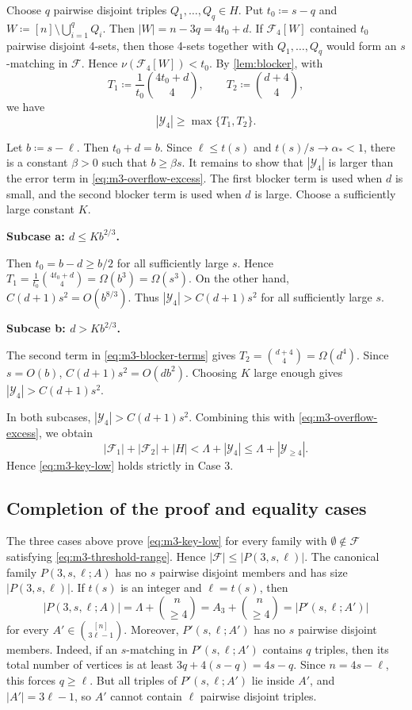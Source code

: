 \documentclass[10pt,a4paper]{article}
\numberwithin{equation}{section}
\theoremstyle{definition}
\newcommand{\F}{\mathcal F}
\newcommand{\Y}{\mathcal Y}
\begin{document}
Choose \(q\) pairwise disjoint triples \(Q_1,\ldots,Q_q\in H\).
Put $t_0\coloneqq s-q$ and $W\coloneqq[n]\setminus\bigcup_{i=1}^q Q_i$.
Then \(|W|=n-3q=4t_0+d\).  If \(\F_4[W]\) contained \(t_0\) pairwise
disjoint 4-sets, then those 4-sets together with
\(Q_1,\ldots,Q_q\) would form an \(s\)-matching in \(\F\).  Hence
\(\nu(\F_4[W])<t_0\).  By \cref{lem:blocker}, with
\[
    T_1\coloneqq \frac1{t_0}\binom{4t_0+d}{4},
    \qquad
    T_2\coloneqq \binom{d+4}{4},
\]
we have
\begin{equation}\label{eq:m3-blocker-terms}
    |\Y_4|
    \ge
    \max\{T_1,T_2\}.
\end{equation}

Let
\(b\coloneqq s-\ell.\)
Then \(t_0+d=b\).  Since \(\ell\le t(s)\) and \(t(s)/s\to\alpha_*<1\),
there is a constant \(\beta>0\) such that
\(b\ge \beta s.\)
It remains to show that \(|\Y_4|\) is larger than the error term in
\eqref{eq:m3-overflow-excess}.  The first blocker term is used when
\(d\) is small, and the second blocker term is used when
\(d\) is large.  Choose a sufficiently large constant \(K\).

\medskip
\noindent\textbf{Subcase a: \(d\le Kb^{2/3}\).}
\medskip

Then \(t_0=b-d\ge b/2\) for all sufficiently large \(s\).  Hence
\(T_1 = \frac1{t_0}\binom{4t_0+d}{4} = \Omega(b^3) = \Omega(s^3).\)
On the other hand,
\(C(d+1)s^2=O(b^{8/3}).\)
Thus
\(|\Y_4|>C(d+1)s^2\)
for all sufficiently large \(s\).

\medskip
\noindent\textbf{Subcase b: \(d>Kb^{2/3}\).}
\medskip

The second term in \eqref{eq:m3-blocker-terms} gives
\(T_2 = \binom{d+4}{4} = \Omega(d^4).\)
Since \(s=O(b)\),
\(C(d+1)s^2=O(db^2).\)
Choosing \(K\) large enough gives
\(|\Y_4|>C(d+1)s^2.\)

In both subcases, \(|\Y_4|>C(d+1)s^2\).  Combining this with
\eqref{eq:m3-overflow-excess}, we obtain
\[
    |\F_1|+|\F_2|+|H|
    <
    \Lambda+|\Y_4|
    \le
    \Lambda+|\Y_{\ge4}|.
\]
Hence \eqref{eq:m3-key-low} holds strictly in Case 3.

\subsection{Completion of the proof and equality cases}

The three cases above prove \eqref{eq:m3-key-low} for every family with
\(\emptyset\notin\F\) satisfying \eqref{eq:m3-threshold-range}.  Hence
\(|\F|\le |P(3,s,\ell)|.\)
The canonical family \(P(3,s,\ell;A)\) has no \(s\) pairwise disjoint members
and has size \(|P(3,s,\ell)|\).  If \(t(s)\) is an integer and \(\ell=t(s)\), then
\[
    |P(3,s,\ell;A)|
    =
    \Lambda+\binom n{\ge4}
    =
    A_3+\binom n{\ge4}
    =
    |P'(s,\ell;A')|
\]
for every \(A'\in\binom{[n]}{3\ell-1}\).  Moreover,
\(P'(s,\ell;A')\) has no \(s\) pairwise disjoint members.  Indeed, if an
\(s\)-matching in \(P'(s,\ell;A')\) contains \(q\) triples, then its total
number of vertices is at least
\(3q+4(s-q)=4s-q.\)
Since \(n=4s-\ell\), this forces \(q\ge\ell\).  But all triples of
\(P'(s,\ell;A')\) lie inside \(A'\), and \(|A'|=3\ell-1\), so \(A'\) cannot
contain \(\ell\) pairwise disjoint triples.
\end{document}
